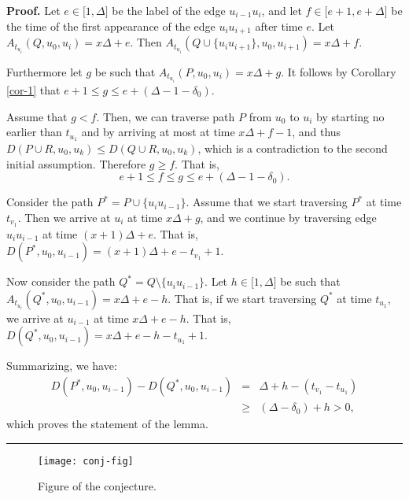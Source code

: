 \documentclass{article}
\newenvironment{proof}[1][Proof]{\noindent\textbf{#1.} }{\ \rule{0.5em}{0.5em}}
\begin{document}
\begin{proof}
Let $e\in \lbrack 1,\Delta ]$ be the label of the edge $u_{i-1}u_{i}$, and
let $f\in \lbrack e+1,e+\Delta ]$ be the time of the first appearance of the
edge $u_{i}u_{i+1}$ after time $e$.  Let $A_{t_{u_{i}}}(Q,u_{0},u_{i})=x%
\Delta +e$. Then $A_{t_{u_{i}}}(Q\cup
\{u_{i}u_{i+1}\},u_{0},u_{i+1})=x\Delta +f$. 

Furthermore let $g$ be such that $A_{t_{u_{i}}}(P,u_{0},u_{i})=x\Delta +g$.
It follows by Corollary \ref{cor-1} that $e+1\leq g\leq e+(\Delta -1-\delta
_{0})$.

Assume that $g<f$. Then, we can traverse path $P$ from $u_{0}$ to $u_{i}$ by
starting no earlier than $t_{u_{1}}$ and by arriving at most at time $%
x\Delta +f-1$, and thus $D(P\cup R,u_{0},u_{k})\leq D(Q\cup R,u_{0},u_{k})$,
which is a contradiction to the second initial assumption. Therefore $g\geq f
$. That is,%
\begin{equation}
e+1\leq f\leq g\leq e+(\Delta -1-\delta _{0}).  \label{basic-eq-2}
\end{equation}

Consider the path $P^{\ast }=P\cup \{u_{i}u_{i-1}\}$. Assume that we start
traversing $P^{\ast }$ at time $t_{v_{1}}$. Then we arrive at $u_{i}$ at
time $x\Delta +g$, and we continue by traversing edge $u_{i}u_{i-1}$ at time 
$(x+1)\Delta +e$. That is, $D(P^{\ast },u_{0},u_{i-1})=(x+1)\Delta
+e-t_{v_{1}}+1$.

Now consider the path $Q^{\ast }=Q\setminus \{u_{i}u_{i-1}\}$. Let $h\in
\lbrack 1,\Delta ]$ be such that $A_{t_{u_{i}}}(Q^{\ast},u_{0},u_{i-1})=x\Delta +e-h
$. That is, if we start traversing $Q^{\ast }$ at time $t_{u_{1}}$, we
arrive at $u_{i-1}$ at time $x\Delta +e-h$. That is, $D(Q^{\ast
},u_{0},u_{i-1})=x\Delta +e-h-t_{u_{1}}+1$.

Summarizing, we have:%
\begin{eqnarray*}
D(P^{\ast },u_{0},u_{i-1})-D(Q^{\ast },u_{0},u_{i-1}) &=&\Delta
+h-(t_{v_{1}}-t_{u_{1}}) \\
&\geq &(\Delta -\delta _{0})+h>0,
\end{eqnarray*}
which proves the statement of the lemma.
\end{proof}

\bigskip

\bigskip

\bigskip

\begin{figure}[htbp]
\centering
\texttt{[image: conj-fig]}
\caption{Figure of the conjecture.}
\label{conj-fig}
\end{figure}

%
%
%
%
\end{document}
